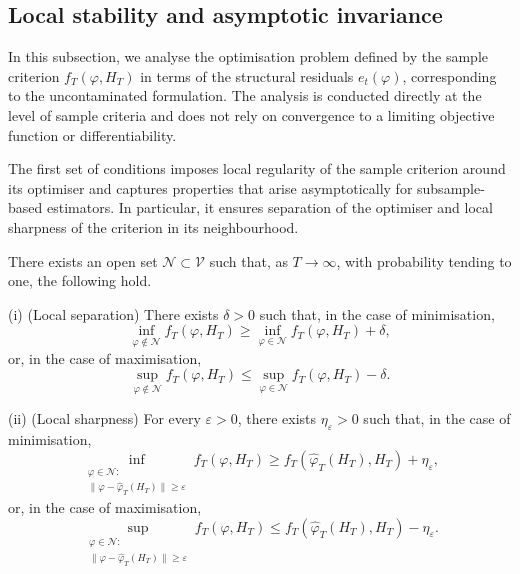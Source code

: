 \documentclass[12pt]{article}
\numberwithin{equation}{section}
\begin{document}
\subsection{Local stability and asymptotic invariance}

In this subsection, we analyse the optimisation problem defined by the sample criterion $f_T(\varphi, H_T)$ in terms of the structural residuals $e_t(\varphi)$, corresponding to the uncontaminated formulation. 
The analysis is conducted directly at the level of sample criteria and does not rely on convergence to a limiting objective function or differentiability.

The first set of conditions imposes local regularity of the sample criterion around its optimiser and captures properties that arise asymptotically for subsample-based estimators. 
In particular, it ensures separation of the optimiser and local sharpness of the criterion in its neighbourhood.

\begin{assumption}\label{ass:local_stab}
There exists an open set $\mathcal N \subset \mathcal V$ such that, as $T \to \infty$, with probability tending to one, the following hold.

\noindent
(i) (Local separation)  
There exists $\delta>0$ such that, in the case of minimisation,
\begin{equation}
\inf_{\varphi\notin\mathcal N} f_T(\varphi,H_T)
\ge
\inf_{\varphi\in\mathcal N} f_T(\varphi,H_T) + \delta,
\end{equation}
or, in the case of maximisation,
\begin{equation}
\sup_{\varphi\notin\mathcal N} f_T(\varphi,H_T)
\le
\sup_{\varphi\in\mathcal N} f_T(\varphi,H_T) - \delta.
\end{equation}

\noindent
(ii) (Local sharpness)  
For every $\varepsilon > 0$, there exists $\eta_\varepsilon > 0$ such that,
in the case of minimisation,
\begin{equation}
\inf_{\substack{\varphi \in \mathcal N:\\
\|\varphi-\hat{\varphi}_T(H_T)\|\ge \varepsilon}}
f_T(\varphi,H_T)
\ge
f_T(\hat{\varphi}_T(H_T),H_T) + \eta_\varepsilon,
\end{equation}
or, in the case of maximisation,
\begin{equation}
\sup_{\substack{\varphi \in \mathcal N:\\
\|\varphi-\hat{\varphi}_T(H_T)\|\ge \varepsilon}}
f_T(\varphi,H_T)
\le
f_T(\hat{\varphi}_T(H_T),H_T) - \eta_\varepsilon.
\end{equation}
\end{assumption}
\end{document}
